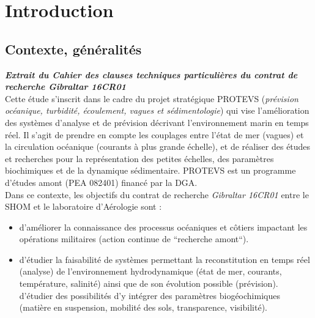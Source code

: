 \documentclass[a4paper,11pt]{report}
\begin{document}
\chapter{Introduction}
\label{chapitreintroduction}

\section{Contexte, généralités}
 \noindent\textbf{\textit{Extrait du Cahier des clauses techniques particulières du contrat de recherche Gibraltar 16CR01}}\\
Cette étude s'inscrit dans le cadre du projet stratégique PROTEVS (\textit{prévision océanique, turbidité, écoulement, vagues et sédimentologie}) qui vise l’amélioration des systèmes d’analyse et de prévision décrivant l’environnement marin en temps réel. Il s’agit de prendre en compte les couplages entre l’état de mer (vagues) et la circulation océanique (courants à plus grande échelle), et de réaliser des études et recherches pour la représentation des petites échelles, des paramètres biochimiques et de la dynamique sédimentaire. PROTEVS est un programme d’études amont (PEA 082401) financé par la DGA.\\

\noindent Dans ce contexte, les objectifs du contrat de recherche \textit{Gibraltar 16CR01} entre le SHOM et le laboratoire d'Aérologie  sont : 

\begin{itemize}[label=\textbullet]
 \item d’améliorer la connaissance des processus océaniques et côtiers impactant les opérations militaires (action continue de ``recherche amont``).
 \item d'étudier la faisabilité de systèmes permettant la reconstitution en temps réel (analyse) de l’environnement hydrodynamique (état de mer, courants, température, salinité) ainsi que de son évolution possible (prévision).
d’étudier des possibilités d’y intégrer des paramètres biogéochimiques (matière en suspension, mobilité des sols, transparence, visibilité).
\end{itemize}
\end{document}
